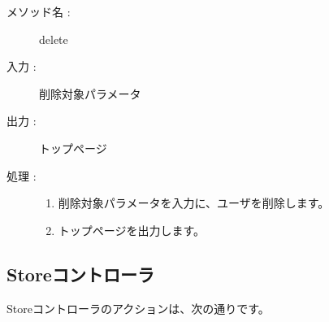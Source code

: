 \documentclass[a4j,titlepage]{jarticle}
\begin{document}
\begin{description}
\item [メソッド名 :] delete
\item [入力 :] 削除対象パラメータ
\item [出力 :] トップページ
\item [処理 :]\mbox{}
  \begin{enumerate}
    \item 削除対象パラメータを入力に、ユーザを削除します。
    \item トップページを出力します。
 \end{enumerate}
\end{description}


\subsection{Storeコントローラ}
Storeコントローラのアクションは、次の通りです。
\end{document}
